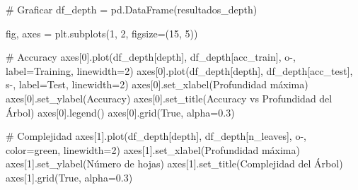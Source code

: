 \documentclass[
  doc,
  floatsintext,
  longtable,
  a4paper,
  nolmodern,
  notxfonts,
  notimes,
  12pt,
  colorlinks=true,linkcolor=blue,citecolor=blue,urlcolor=blue]{apa7}
\newenvironment{Shaded}{\begin{snugshade}}{\end{snugshade}}
\newcommand{\CommentTok}[1]{\textcolor[rgb]{0.37,0.37,0.37}{#1}}
\newcommand{\DecValTok}[1]{\textcolor[rgb]{0.68,0.00,0.00}{#1}}
\newcommand{\FloatTok}[1]{\textcolor[rgb]{0.68,0.00,0.00}{#1}}
\newcommand{\NormalTok}[1]{\textcolor[rgb]{0.00,0.23,0.31}{#1}}
\newcommand{\OperatorTok}[1]{\textcolor[rgb]{0.37,0.37,0.37}{#1}}
\newcommand{\StringTok}[1]{\textcolor[rgb]{0.13,0.47,0.30}{#1}}
\newcommand{\VariableTok}[1]{\textcolor[rgb]{0.07,0.07,0.07}{#1}}
\begin{document}
\begin{Shaded}
\begin{Highlighting}[]
\CommentTok{\# Graficar}
\NormalTok{df\_depth }\OperatorTok{=}\NormalTok{ pd.DataFrame(resultados\_depth)}

\NormalTok{fig, axes }\OperatorTok{=}\NormalTok{ plt.subplots(}\DecValTok{1}\NormalTok{, }\DecValTok{2}\NormalTok{, figsize}\OperatorTok{=}\NormalTok{(}\DecValTok{15}\NormalTok{, }\DecValTok{5}\NormalTok{))}

\CommentTok{\# Accuracy}
\NormalTok{axes[}\DecValTok{0}\NormalTok{].plot(df\_depth[}\StringTok{\textquotesingle{}depth\textquotesingle{}}\NormalTok{], df\_depth[}\StringTok{\textquotesingle{}acc\_train\textquotesingle{}}\NormalTok{], }
             \StringTok{\textquotesingle{}o{-}\textquotesingle{}}\NormalTok{, label}\OperatorTok{=}\StringTok{\textquotesingle{}Training\textquotesingle{}}\NormalTok{, linewidth}\OperatorTok{=}\DecValTok{2}\NormalTok{)}
\NormalTok{axes[}\DecValTok{0}\NormalTok{].plot(df\_depth[}\StringTok{\textquotesingle{}depth\textquotesingle{}}\NormalTok{], df\_depth[}\StringTok{\textquotesingle{}acc\_test\textquotesingle{}}\NormalTok{], }
             \StringTok{\textquotesingle{}s{-}\textquotesingle{}}\NormalTok{, label}\OperatorTok{=}\StringTok{\textquotesingle{}Test\textquotesingle{}}\NormalTok{, linewidth}\OperatorTok{=}\DecValTok{2}\NormalTok{)}
\NormalTok{axes[}\DecValTok{0}\NormalTok{].set\_xlabel(}\StringTok{\textquotesingle{}Profundidad máxima\textquotesingle{}}\NormalTok{)}
\NormalTok{axes[}\DecValTok{0}\NormalTok{].set\_ylabel(}\StringTok{\textquotesingle{}Accuracy\textquotesingle{}}\NormalTok{)}
\NormalTok{axes[}\DecValTok{0}\NormalTok{].set\_title(}\StringTok{\textquotesingle{}Accuracy vs Profundidad del Árbol\textquotesingle{}}\NormalTok{)}
\NormalTok{axes[}\DecValTok{0}\NormalTok{].legend()}
\NormalTok{axes[}\DecValTok{0}\NormalTok{].grid(}\VariableTok{True}\NormalTok{, alpha}\OperatorTok{=}\FloatTok{0.3}\NormalTok{)}

\CommentTok{\# Complejidad}
\NormalTok{axes[}\DecValTok{1}\NormalTok{].plot(df\_depth[}\StringTok{\textquotesingle{}depth\textquotesingle{}}\NormalTok{], df\_depth[}\StringTok{\textquotesingle{}n\_leaves\textquotesingle{}}\NormalTok{], }
             \StringTok{\textquotesingle{}o{-}\textquotesingle{}}\NormalTok{, color}\OperatorTok{=}\StringTok{\textquotesingle{}green\textquotesingle{}}\NormalTok{, linewidth}\OperatorTok{=}\DecValTok{2}\NormalTok{)}
\NormalTok{axes[}\DecValTok{1}\NormalTok{].set\_xlabel(}\StringTok{\textquotesingle{}Profundidad máxima\textquotesingle{}}\NormalTok{)}
\NormalTok{axes[}\DecValTok{1}\NormalTok{].set\_ylabel(}\StringTok{\textquotesingle{}Número de hojas\textquotesingle{}}\NormalTok{)}
\NormalTok{axes[}\DecValTok{1}\NormalTok{].set\_title(}\StringTok{\textquotesingle{}Complejidad del Árbol\textquotesingle{}}\NormalTok{)}
\NormalTok{axes[}\DecValTok{1}\NormalTok{].grid(}\VariableTok{True}\NormalTok{, alpha}\OperatorTok{=}\FloatTok{0.3}\NormalTok{)}


\end{Highlighting}
\end{Shaded}
\end{document}
